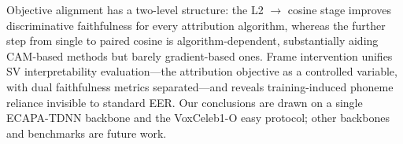 \documentclass{article}
\begin{document}
Objective alignment has a two-level structure: the L2 $\to$ cosine stage improves discriminative faithfulness for every attribution algorithm, whereas the further step from single to paired cosine is algorithm-dependent, substantially aiding CAM-based methods but barely gradient-based ones. Frame intervention unifies SV interpretability evaluation---the attribution objective as a controlled variable, with dual faithfulness metrics separated---and reveals training-induced phoneme reliance invisible to standard EER. Our conclusions are drawn on a single ECAPA-TDNN backbone and the VoxCeleb1-O easy protocol; other backbones and benchmarks are future work.

\balance


\end{document}

